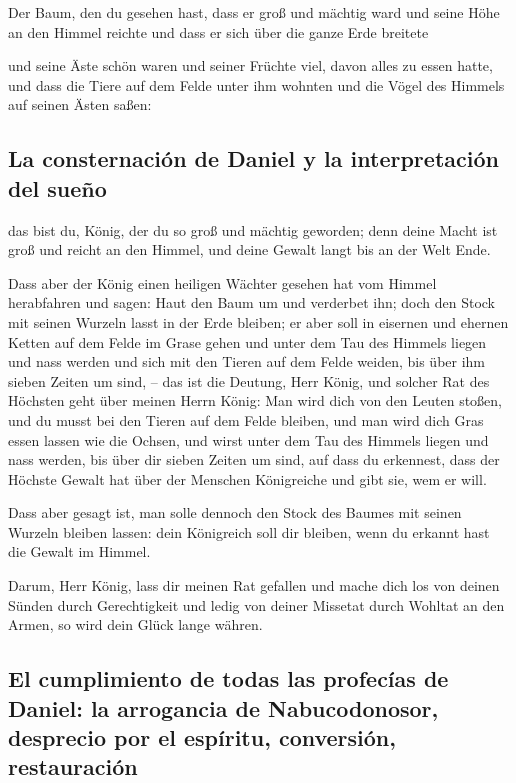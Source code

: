  Der Baum, den du gesehen hast, dass er groß und mächtig
ward und seine Höhe an den Himmel reichte und dass er sich über die
ganze Erde breitete

 und seine Äste schön waren und seiner Früchte viel,
davon alles zu essen hatte, und dass die Tiere auf dem Felde unter ihm
wohnten und die Vögel des Himmels auf seinen Ästen saßen:

\hypertarget{la-consternaciuxf3n-de-daniel-y-la-interpretaciuxf3n-del-sueuxf1o}{%
\subsection{La consternación de Daniel y la interpretación del
sueño}\label{la-consternaciuxf3n-de-daniel-y-la-interpretaciuxf3n-del-sueuxf1o}}

 das bist du, König, der du so groß und mächtig geworden;
denn deine Macht ist groß und reicht an den Himmel, und deine Gewalt
langt bis an der Welt Ende.

 Dass aber der König einen heiligen Wächter gesehen hat
vom Himmel herabfahren und sagen: Haut den Baum um und verderbet ihn;
doch den Stock mit seinen Wurzeln lasst in der Erde bleiben; er aber
soll in eisernen und ehernen Ketten auf dem Felde im Grase gehen und
unter dem Tau des Himmels liegen und nass werden und sich mit den Tieren
auf dem Felde weiden, bis über ihm sieben Zeiten um sind, --
 das ist die Deutung, Herr König, und solcher Rat des
Höchsten geht über meinen Herrn König:  Man wird dich von
den Leuten stoßen, und du musst bei den Tieren auf dem Felde bleiben,
und man wird dich Gras essen lassen wie die Ochsen, und wirst unter dem
Tau des Himmels liegen und nass werden, bis über dir sieben Zeiten um
sind, auf dass du erkennest, dass der Höchste Gewalt hat über der
Menschen Königreiche und gibt sie, wem er will.

 Dass aber gesagt ist, man solle dennoch den Stock des
Baumes mit seinen Wurzeln bleiben lassen: dein Königreich soll dir
bleiben, wenn du erkannt hast die Gewalt im Himmel.

 Darum, Herr König, lass dir meinen Rat gefallen und
mache dich los von deinen Sünden durch Gerechtigkeit und ledig von
deiner Missetat durch Wohltat an den Armen, so wird dein Glück lange
währen.

\hypertarget{el-cumplimiento-de-todas-las-profecuxedas-de-daniel-la-arrogancia-de-nabucodonosor-desprecio-por-el-espuxedritu-conversiuxf3n-restauraciuxf3n}{%
\subsection{El cumplimiento de todas las profecías de Daniel: la
arrogancia de Nabucodonosor, desprecio por el espíritu, conversión,
restauración}\label{el-cumplimiento-de-todas-las-profecuxedas-de-daniel-la-arrogancia-de-nabucodonosor-desprecio-por-el-espuxedritu-conversiuxf3n-restauraciuxf3n}}

